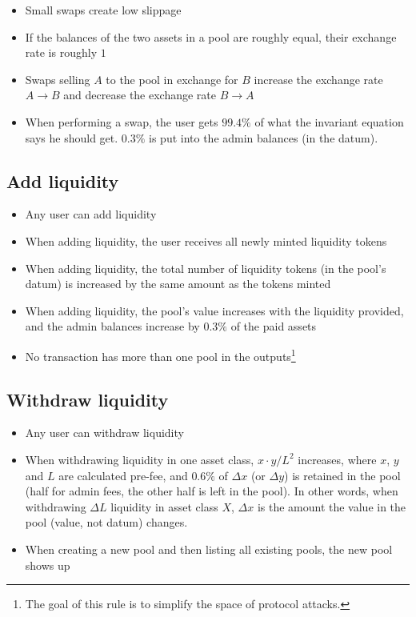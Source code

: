 \documentclass{article}
\begin{document}
\begin{itemize}
  \item Small swaps create low slippage
  \item If the balances of the two assets in a pool are roughly equal, their
    exchange rate is roughly $1$
  \item Swaps selling $A$ to the pool in exchange for $B$ increase the exchange
    rate $A \rightarrow B$ and decrease the exchange rate $B \rightarrow A$
  \item When performing a swap, the user gets $99.4\%$ of what the invariant
    equation says he should get. $0.3\%$ is put into the admin balances (in the
    datum).
\end{itemize}

\subsection*{Add liquidity}

\begin{itemize}
  \item Any user can add liquidity
  \item When adding liquidity, the user receives all newly minted liquidity
    tokens
  \item When adding liquidity, the total number of liquidity tokens (in the
    pool's datum) is increased by the same amount as the tokens minted
  \item When adding liquidity, the pool's value increases with the liquidity
    provided, and the admin balances increase by $0.3\%$ of the paid assets
  \item No transaction has more than one pool in the outputs\footnote{
      The goal of this rule is to simplify the space of protocol attacks.}
\end{itemize}

\subsection*{Withdraw liquidity}

\begin{itemize}
  \item Any user can withdraw liquidity
  \item When withdrawing liquidity in one asset class, $x \cdot y / L^2$
    increases, where $x$, $y$ and $L$ are calculated pre-fee, and $0.6\%$ of
    $\Delta x$ (or $\Delta y$) is retained in the pool (half for admin fees, the
    other half is left in the pool). In other words, when withdrawing $\Delta L$
    liquidity in asset class $X$, $\Delta x$ is the amount the value in the pool
    (value, not datum) changes.
  \item When creating a new pool and then listing all existing pools, the new
    pool shows up
\end{itemize}
\end{document}
